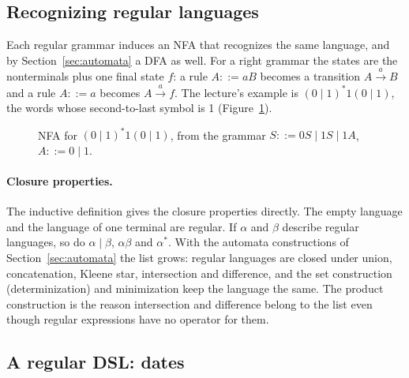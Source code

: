 \subsection{Recognizing regular languages}

Each regular grammar induces an NFA that recognizes the same language, and by
Section~\ref{sec:automata} a DFA as well. For a right grammar the states are
the nonterminals plus one final state $f$: a rule $A ::= aB$ becomes a
transition $A \xrightarrow{a} B$ and a rule $A ::= a$ becomes
$A \xrightarrow{a} f$. The lecture's example is $(0 \mid 1)^*1(0 \mid 1)$, the
words whose second-to-last symbol is 1 (Figure~\ref{fig:second-last}).

\begin{figure}[h]
\centering
{}
\caption{NFA for $(0 \mid 1)^*1(0 \mid 1)$, from the grammar
$S ::= 0S \mid 1S \mid 1A$, $A ::= 0 \mid 1$.}
\label{fig:second-last}
\end{figure}

\paragraph{Closure properties.} The inductive definition gives the closure
properties directly. The empty language and the language of one terminal are
regular. If $\alpha$ and $\beta$ describe regular languages, so do
$\alpha \mid \beta$, $\alpha\beta$ and $\alpha^*$. With the automata constructions
of Section~\ref{sec:automata} the list grows: regular languages are closed
under union, concatenation, Kleene star, intersection and difference, and the
set construction (determinization) and minimization keep the language the
same. The product construction is the reason intersection and difference
belong to the list even though regular expressions have no operator for them.

\subsection{A regular DSL: dates}

